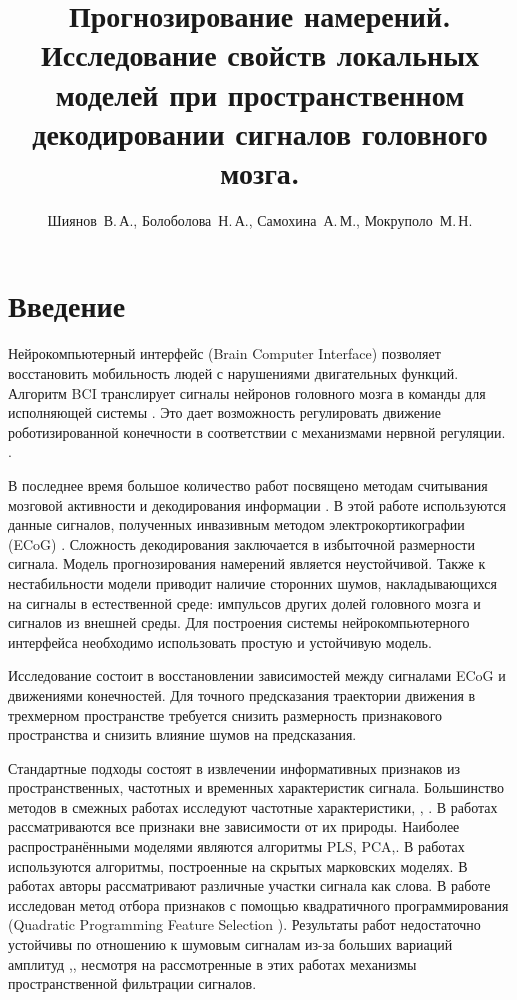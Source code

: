 \documentclass[12pt,twoside]{article}
\title
    [Прогнозирование намерений]
    {Прогнозирование намерений. Исследование свойств локальных моделей при пространственном декодировании сигналов головного мозга.}
\author
    [Болоболова~Н.\,А.]
    {Шиянов~В.\,А., Болоболова~Н.\,А., Самохина~А.\,М., Мокруполо~М.\,Н.}
\begin{document}
\maketitle
\bigskip
\bigskip
\bigskip
\bigskip
\bigskip
\maketitleSecondary

\section{Введение}
Нейрокомпьютерный интерфейс (Brain Computer Interface) \cite{Morishita2014} позволяет восстановить мобильность людей с нарушениями двигательных функций.  Алгоритм BCI транслирует сигналы нейронов головного мозга в команды для исполняющей системы \cite{Morishita2014}. Это дает возможность регулировать движение роботизированной конечности в соответствии с механизмами нервной регуляции. \cite{Donoghue2008}. 


В последнее время большое количество работ посвящено методам считывания мозговой активности и декодирования информации \cite{Hu2018}\cite{Song2017}\cite{Loza2017}\cite{Eliseyev2016}\cite{Gaglianese2016}\cite{Bundy2016}\cite{Morishita2014}.
В этой работе используются данные сигналов, полученных инвазивным методом электрокортикографии (ECoG) \cite{Sirven2014}. Сложность декодирования заключается в избыточной размерности сигнала. Модель прогнозирования намерений является неустойчивой. Также к нестабильности модели приводит наличие сторонних шумов, накладывающихся на сигналы в естественной среде: импульсов других долей головного мозга и сигналов из внешней среды.  Для построения системы нейрокомпьютерного интерфейса необходимо использовать простую и устойчивую модель. 


Исследование состоит в восстановлении зависимостей между сигналами ECoG и движениями конечностей. Для точного предсказания траектории движения в трехмерном пространстве требуется снизить размерность признакового пространства и снизить влияние шумов на предсказания.


Стандартные подходы состоят в извлечении информативных признаков из пространственных, частотных и временных характеристик сигнала\cite{Morishita2014}\cite{Alexander2013}. Большинство методов в смежных работах исследуют частотные характеристики\cite{Chin2007}, \cite{Eliseyev2014}, \cite{Loza2017}. В работах \cite{Eliseyev2016}\cite{Motrenko2018} рассматриваются все признаки вне зависимости от их природы. Наиболее распространёнными моделями являются алгоритмы PLS\cite{Rosipal2006}\cite{Eliseyev2016}, PCA\cite{Zhao2010},\cite{Song2017}. В работах \cite{Zhao2014} используются алгоритмы, построенные на скрытых марковских моделях. В  работах \cite{Loza2017}\cite{Song2017} авторы рассматривают различные участки сигнала как слова. В работе \cite{Motrenko2018} исследован метод отбора признаков с помощью квадратичного программирования (Quadratic Programming Feature Selection \cite{rodriguez2010quadratic}). Результаты работ недостаточно устойчивы по отношению к шумовым сигналам из-за больших вариаций амплитуд \cite{Eliseyev2014},\cite{Song2017}, несмотря на рассмотренные в этих работах механизмы пространственной фильтрации сигналов.
\end{document}
